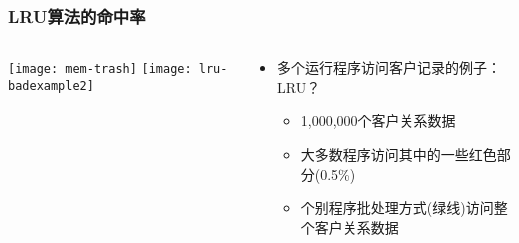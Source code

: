 \begin{frame}[plain]
	\frametitle{LRU算法的命中率}
	\begin{columns}
		\begin{column}{.5\textwidth}
			\centering
			\texttt{[image: mem-trash]}
			\texttt{[image: lru-badexample2]}
			
		\end{column}
		
		\begin{column}{.5\textwidth}
			
			\begin{itemize}
				\item 多个运行程序访问客户记录的例子：LRU？
				\begin{itemize}
					\item 1,000,000个客户关系数据
					\item 大多数程序访问其中的一些红色部分(0.5\%)
					\item 个别程序批处理方式(绿线)访问整个客户关系数据
					
				\end{itemize}
			\end{itemize}
			
		\end{column}
		
		
	\end{columns}
\end{frame}

